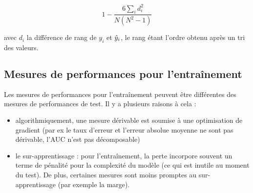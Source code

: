 		$$1 - \frac{6 \sum_i d_i^2}{N(N^2 - 1)}$$
		
		avec $d_i$ la différence de rang de $y_i$ et $\hat{y}_i$, le rang étant l'ordre obtenu après un tri des valeurs.
		
	\subsection{Mesures de performances pour l'entraînement}
	
	Les mesures de performances pour l'entraînement peuvent être différentes des mesures de performances de test. Il y a plusieurs raisons à cela :
	
	\begin{itemize}
		\item algorithmiquement, une mesure dérivable est soumise à une optimisation de gradient (par ex le taux d'erreur et l'erreur absolue moyenne ne sont pas dérivable, l'AUC n'est pas décomposable)
		\item le sur-apprentissage : pour l'entraînement, la perte incorpore souvent un terme de pénalité pour la complexité du modèle (ce qui est inutile au moment du test). De plus, certaines mesures sont moins promptes au sur-apprentissage (par exemple la marge).
	\end{itemize}